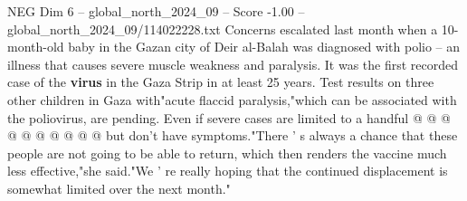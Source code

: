 \begin{textsample}{NEG Dim 6 – global\_north\_2024\_09 – Score -1.00 – global\_north\_2024\_09/114022228.txt}
Concerns escalated last month when a 10-month-old baby in the Gazan city of Deir al-Balah was diagnosed with polio -- an illness that causes severe muscle weakness and paralysis.
It was the first recorded case of the \textbf{virus} in the Gaza Strip in at least 25 years.
Test results on three other children in Gaza with"acute flaccid paralysis,"which can be associated with the poliovirus, are pending.
Even if severe cases are limited to a handful @ @ @ @ @ @ @ @ @ @ but don't have symptoms."There ' s always a chance that these people are not going to be able to return, which then renders the vaccine much less effective,"she said."We ' re really hoping that the continued displacement is somewhat limited over the next month."

\end{textsample}
